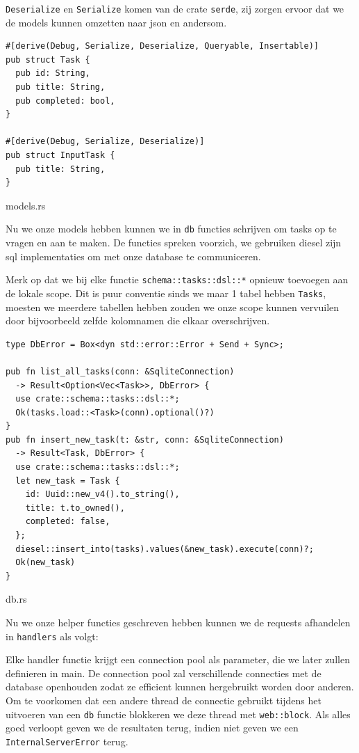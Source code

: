 \texttt{Deserialize} en \texttt{Serialize} komen van de crate
\texttt{serde}, zij zorgen ervoor dat we de models kunnen omzetten naar json en andersom.

\clearpage

\begin{listing}[h]
\begin{verbatim}
#[derive(Debug, Serialize, Deserialize, Queryable, Insertable)]
pub struct Task {
  pub id: String,
  pub title: String,
  pub completed: bool,
}

#[derive(Debug, Serialize, Deserialize)]
pub struct InputTask {
  pub title: String,
}
\end{verbatim}
\caption{models.rs}
\end{listing}

Nu we onze models hebben kunnen we in \texttt{db} functies schrijven om tasks op te vragen
en aan te maken. De functies spreken voorzich, we gebruiken diesel zijn sql implementaties om met
onze database te communiceren.

Merk op dat we bij elke functie \texttt{schema::tasks::dsl::*} opnieuw toevoegen aan de
lokale scope. Dit is puur conventie sinds we maar 1 tabel hebben \texttt{Tasks}, moesten
we meerdere tabellen hebben zouden we onze scope kunnen vervuilen door bijvoorbeeld zelfde
kolomnamen die elkaar overschrijven.

\begin{listing}[h]
\begin{verbatim}
type DbError = Box<dyn std::error::Error + Send + Sync>;

pub fn list_all_tasks(conn: &SqliteConnection) 
  -> Result<Option<Vec<Task>>, DbError> {
  use crate::schema::tasks::dsl::*;
  Ok(tasks.load::<Task>(conn).optional()?)
}
pub fn insert_new_task(t: &str, conn: &SqliteConnection) 
  -> Result<Task, DbError> {
  use crate::schema::tasks::dsl::*;
  let new_task = Task {
    id: Uuid::new_v4().to_string(),
    title: t.to_owned(),
    completed: false,
  };
  diesel::insert_into(tasks).values(&new_task).execute(conn)?;
  Ok(new_task)
}
\end{verbatim}
\caption{db.rs}
\end{listing}

\clearpage

Nu we onze helper functies geschreven hebben kunnen we de requests afhandelen in
\texttt{handlers} als volgt:

Elke handler functie krijgt een connection pool als parameter, die we later zullen definieren in
main. De connection pool zal verschillende connecties met de database openhouden zodat ze efficient
kunnen hergebruikt worden door anderen. Om te voorkomen dat een andere thread de connectie gebruikt
tijdens het uitvoeren van een \texttt{db} functie blokkeren we deze thread met
\texttt{web::block}. Als alles goed verloopt geven we de resultaten terug, indien niet
geven we een \texttt{InternalServerError} terug.

